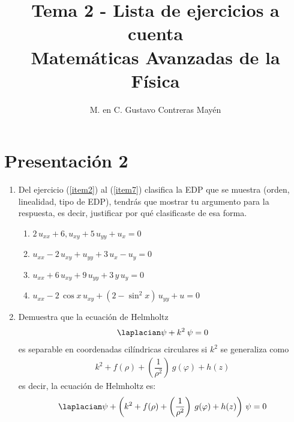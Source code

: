 
\title{Tema 2 - Lista de ejercicios a cuenta\\ \large{Matemáticas Avanzadas de la Física}\vspace{-3ex}}
\author{M. en C. Gustavo Contreras Mayén}
\date{ }

\vspace{-4cm}
\maketitle
\fontsize{14}{14}\selectfont
\section{Presentación 2}
\begin{enumerate}
\item  Del ejercicio (\ref{item2}) al (\ref{item7}) clasifica la EDP que se muestra (orden, linealidad, tipo de EDP), tendrás que mostrar tu argumento para la respuesta, es decir, justificar por qué clasificaste de esa forma.
\begin{enumerate}
\item $2 \, u_{xx} + 6 , u_{xy} + 5 \, u_{yy} + u_{x} = 0$ \label{item2}
\item $u_{xx} - 2 \, u_{xy} + u_{yy} + 3 \, u_{x} - u_{y} = 0$ \label{item3}
\item $u_{xx} + 6 \, u_{xy} + 9 \, u_{yy} + 3 \, y \, u_{y} = 0$ \label{item5}
\item $u_{xx} - 2 \, \cos x \, u_{xy} +  (2 - \sin^{2} x) \, u_{yy} + u = 0$ \label{item7}
\end{enumerate}
\item Demuestra que la ecuación de Helmholtz
\begin{align*}
\laplacian \psi + k^{2} \: \psi = 0
\end{align*}
es separable en coordenadas cilíndricas circulares si $k^{2}$ se generaliza como
\begin{align*}
k^{2} + f(\rho) + \left( \dfrac{1}{\rho^{2}} \right) \: g(\varphi) + h(z)
\end{align*}
es decir, la ecuación de Helmholtz es:
\begin{align*}
\laplacian \psi + \left( k^{2} + f(\rho) + \left( \dfrac{1}{\rho^{2}} \right) \: g(\varphi) + h(z) \right) \, \psi = 0
\end{align*}
\end{enumerate}
